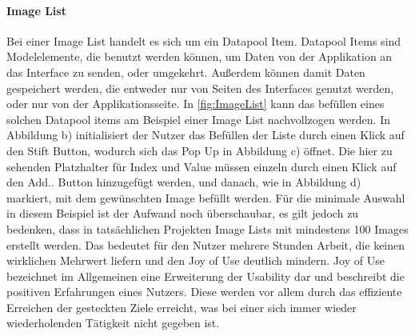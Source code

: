 \paragraph{Image List}
Bei einer Image List handelt es sich um ein Datapool Item. 
Datapool Items sind Modelelemente, die benutzt werden können, um Daten von der Applikation an das Interface zu senden, oder umgekehrt.
Außerdem können damit Daten gespeichert werden, die entweder nur von Seiten des Interfaces genutzt werden, oder nur von der Applikationsseite\cite{studio_guide}.
In \cref{fig:ImageList} kann das befüllen eines solchen Datapool items am Beispiel einer Image List nachvollzogen werden.
In Abbildung b) initialisiert der Nutzer das Befüllen der Liste durch einen Klick auf den \glqq Stift\grqq{} Button, wodurch sich das Pop Up in Abbildung c) öffnet.
Die hier zu sehenden Platzhalter für Index und Value müssen einzeln durch einen Klick auf den \glqq Add..\grqq{} Button hinzugefügt werden, und danach, wie in Abbildung d) markiert, mit dem gewünschten Image befüllt werden.
Für die minimale Auswahl in diesem Beispiel ist der Aufwand noch überschaubar, es gilt jedoch zu bedenken, dass in tatsächlichen Projekten Image Lists mit mindestens 100 Images erstellt werden.
Das bedeutet für den Nutzer mehrere Stunden Arbeit, die keinen wirklichen Mehrwert liefern und den Joy of Use deutlich mindern.
Joy of Use bezeichnet im Allgemeinen eine Erweiterung der Usability dar und beschreibt die positiven Erfahrungen eines Nutzers.
Diese werden vor allem durch das effiziente Erreichen der gesteckten Ziele erreicht, was bei einer sich immer wieder wiederholenden Tätigkeit nicht gegeben ist.

